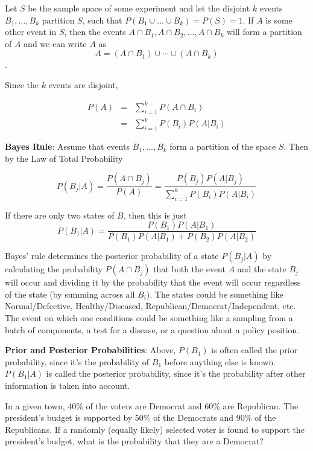 \documentclass[]{book}
\theoremstyle{definition}
\theoremstyle{definition}
\theoremstyle{definition}
\theoremstyle{remark}
\let\BeginKnitrBlock\begin \let\EndKnitrBlock\end
\begin{document}
\BeginKnitrBlock{definition}[Law of Total Probability]
\protect\hypertarget{def:unnamed-chunk-69}{}{\label{def:unnamed-chunk-69} {} }Let \(S\) be the sample space of some experiment and let the disjoint \(k\) events \(B_1,\ldots,B_k\) partition \(S\), such that \(P(B_1\cup ... \cup B_k) = P(S) = 1\). If \(A\) is some other event in \(S\), then the events \(A\cap B_1, A\cap B_2, \ldots, A\cap B_k\) will form a partition of \(A\) and we can write \(A\) as \[A=(A\cap B_1)\cup\cdots\cup (A\cap B_k)\].

Since the \(k\) events are disjoint,

\begin{eqnarray*}
P(A)&=&\sum\limits_{i=1}^k P(A \cap B_i)\\
      &=&\sum\limits_{i=1}^k P(B_i)P(A|B_i)
\end{eqnarray*}
\EndKnitrBlock{definition}

\textbf{Bayes Rule}: Assume that events \(B_1,\ldots,B_k\) form a partition of the space \(S\). Then by the Law of Total Probability

\[P(B_j|A)= \frac{P(A \cap B_j)} {P(A)} = \frac{P(B_j) P(A|B_j)}{\sum\limits_{i=1}^k P(B_i)P(A|B_i)}\]

If there are only two states of \(B\), then this is just
\[P(B_1|A)=\frac{P(B_1)P(A|B_1)} {P(B_1)P(A|B_1)+P(B_2)P(A|B_2)}\]

Bayes' rule determines the posterior probability of a state \(P(B_j|A)\) by calculating the probability \(P(A \cap B_j)\) that both the event \(A\) and the state \(B_j\) will occur and dividing it by the probability that the event will occur regardless of the state (by summing across all \(B_i\)). The states could be something like Normal/Defective, Healthy/Diseased, Republican/Democrat/Independent, etc. The event on which one conditions could be something like a sampling from a batch of components, a test for a disease, or a question about a policy position.

\textbf{Prior and Posterior Probabilities}: Above, \(P(B_1)\) is often called the prior probability, since it's the probability of \(B_1\) before anything else is known. \(P(B_1|A)\) is called the posterior probability, since it's the probability after other information is taken into account.

\BeginKnitrBlock{example}[Bayes' Rule]
\protect\hypertarget{exm:bayesrule}{}{\label{exm:bayesrule} {} }
In a given town, 40\% of the voters are Democrat and 60\% are Republican. The president's budget is supported by 50\% of the Democrats and 90\% of the Republicans. If a randomly (equally likely) selected voter is found to support the president's budget, what is the probability that they are a Democrat?
\EndKnitrBlock{example}
\end{document}
